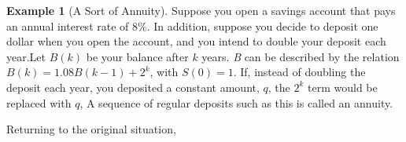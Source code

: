\documentclass[10pt,]{book}
\theoremstyle{plain}
\theoremstyle{definition}
\theoremstyle{definition}
\theoremstyle{definition}
\newtheorem{example}[theorem]{Example}
\theoremstyle{definition}
\numberwithin{equation}{section}
\begin{document}
\begin{example}[A Sort of Annuity]\label{ex-a-novel-annuity}
 Suppose you open a savings account that pays an annual interest rate of \(8\%\). In addition, suppose you decide to deposit one dollar when you open the account, and you intend to double your deposit each year.Let \(B(k)\) be your balance after \(k\) years. \textit{
B} can be described by the relation \(B(k) = 1.08 B(k - 1) + 2^k\), with \(S(0) = 1\). If, instead of doubling the deposit each year, you deposited
a constant amount, \(q\), the \(2^k\) term would be replaced with \(q\), A sequence of regular deposits such as this is called an annuity.%
\par
Returning to the original situation,%
\par
\leavevmode%
%
\end{example}
\end{document}
